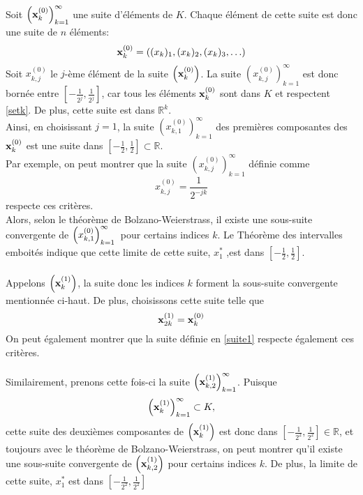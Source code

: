 \documentclass[letterpaper,12pt,oneside,final]{book}
\begin{document}
Soit $ \left(\vb{x}_{k}^{(0)} \right)_{k=1}^{\infty} $ une suite d'éléments de $K$. Chaque élément de cette suite est donc 
une suite de $n$ éléments:
\[
\vb{x}_{k}^{(0)}  = \left( (x_{k})_{1},(x_{k})_{2}, (x_{k})_{3},\ldots \right) 
\]
Soit \(  x_{k,j}^{(0)}  \) le $j$-ème élément de la suite \( \left(\vb{x}_{k}^{(0)}\right)  \). La suite
\(
\left( x_{k,j}^{(0)}\right)_{k=1}^{\infty }
\)
est donc bornée entre \( [-\frac{1}{2^{j}}, \frac{1}{2^{j}}] \), car tous les éléments \( \vb{x}_{k}^{(0)}  \) sont dans $K$
et respectent \ref{setk}. De plus, cette suite est dans $\mathbb{R}^{k}$. \\
Ainsi, en choisissant \( j=1 \), la suite \( \left( x_{k,1}^{(0)}\right)_{k=1}^{\infty } \) des premières composantes des \( \vb{x}_{k}^{(0)} \) est une suite dans 
\( [-\frac{1}{2},\frac{1}{2}]\subset \mathbb{R} \).\\
Par exemple, on peut montrer que la suite \( \left( x_{k,j}^{(0)}\right)_{k=1}^{\infty } \) définie comme
\begin{equation} \label{suite1}
    x_{k,j}^{(0)} = \frac{1}{2^{-jk}}
\end{equation}
respecte ces critères.\\
Alors, selon le théorème de Bolzano-Weierstrass, il existe une sous-suite convergente de \(
    \left( x_{k,1}^{(0)}\right)_{k=1}^{\infty } \\
    \) pour certains indices $k$. Le Théorème des intervalles emboités indique que cette limite de cette suite, 
   \( x_{1}^{*} \) ,est dans $[-\frac{1}{2},\frac{1}{2}]$. \\\\
Appelons \( \left(\vb{x}_{k}^{(1)}\right) \), la suite donc les indices $k$ forment la sous-suite convergente mentionnée ci-haut.
De plus, choisissons cette suite telle que 
\[
\vb{x}^{(1)}_{2k} = \vb{x}^{(0)}_{k}
\]
On peut également montrer que la suite définie en \ref{suite1} respecte également ces critères.\\\\
Similairement, prenons cette fois-ci la suite \( \left(\vb{x}_{k,2}^{(1)}\right)_{k=1}^{\infty } \). Puisque 
\[
    \left(\vb{x}_{k}^{(1)}\right)_{k=1}^{\infty } \subset K,
\]
cette suite des deuxièmes composantes de \( \left( \vb{x}_{k}^{(1)}\right) \) est donc dans \( [-\frac{1}{2^{2}},\frac{1}{2^{2}}] \in \mathbb{R} \),
et toujours avec le théorème de Bolzano-Weierstrass, on peut montrer qu'il existe une sous-suite convergente de 
\( \left( \vb{x}_{k,2}^{(1)}\right)  \) pour certains indices $k$. De plus, la limite de cette suite, \( x_{1}^{*} \) est dans  \( [-\frac{1}{2^{2}},\frac{1}{2^{2}}]\)\\
\end{document}
